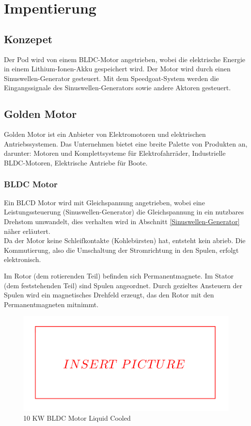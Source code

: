 \chapter{Impentierung}

\section{Konzepet}
Der Pod wird von einem BLDC-Motor angetrieben, wobei die elektrische Energie in einem Lithium-Ionen-Akku gespeichert wird. Der Motor wird durch einen Sinuswellen-Generator gesteuert. Mit dem Speedgoat-System werden die Eingangssignale des Sinuswellen-Generators sowie andere Aktoren gesteuert.

\section{Golden Motor}
\label{Golden_Motor}
Golden Motor ist ein Anbieter von Elektromotoren und elektrischen Antriebssystemen. Das Unternehmen bietet eine breite Palette von Produkten an, darunter:
Motoren und Komplettsysteme für Elektrofahrräder, Industrielle BLDC-Motoren, Elektrische Antriebe für Boote.


\subsection{BLDC Motor}
\label{BLDC_Motor}
Ein BLCD Motor wird mit Gleichspannung angetrieben, wobei eine Leistungssteuerung (Sinuswellen-Generator) die Gleichspannung in ein nutzbares Drehstom umwandelt, dies verhalten wird in Abschnitt \ref{Sinuswellen-Generator} näher erläutert.\\

Da der Motor keine Schleifkontakte (Kohlebürsten) hat, entsteht kein abrieb. Die Kommutierung, also die Umschaltung der Stromrichtung in den Spulen, erfolgt elektronisch.

Im Rotor (dem rotierenden Teil) befinden sich Permanentmagnete. Im Stator (dem feststehenden Teil) sind Spulen angeordnet. Durch gezieltes Ansteuern der Spulen wird ein magnetisches Drehfeld erzeugt, das den Rotor mit den Permanentmagneten mitnimmt.

\begin{figure}[!ht]
	\begin{center}
		\includegraphics[width=\textwidth]{img/2_imp/insert_pic.png}
		\caption{10 KW BLDC Motor Liquid Cooled}
		\label{img_2_2:motor}
	\end{center}
\end{figure}


